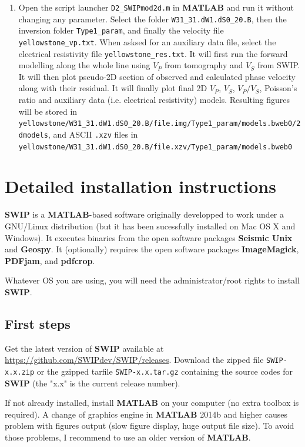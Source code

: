 \documentclass[twoside,a4paper]{article}
\def\SWIP{\textbf{SWIP}}
\def\SeismicUnix{\textbf{Seismic Unix}}
\def\Geopsy{\textbf{Geospy}}
\def\ImageMagick{\textbf{ImageMagick}}
\def\PDFjam{\textbf{PDFjam}}
\def\pdfcrop{\textbf{pdfcrop}}
\def\MATLAB{\textbf{MATLAB}}
\begin{document}
\begin{enumerate}[leftmargin=*]
\item Open the script launcher \verb|D2_SWIPmod2d.m| in {\MATLAB} and run it without changing any parameter. Select the folder \verb|W31_31.dW1.dS0_20.B|, then the inversion folder \verb|Type1_param|, and finally the velocity file \verb|yellowstone_vp.txt|. When asksed for an auxiliary data file, select the electrical resistivity file \verb|yellowstone_res.txt|. It will first run the forward modelling along the whole line using $V_P$ from tomography and $V_S$ from SWIP. It will then plot pseudo-2D section of observed and calculated phase velocity along with their residual. It will finally plot final 2D $V_P$, $V_S$, $V_P/V_S$, Poisson's ratio and auxiliary data (i.e. electrical resistivity) models. Resulting figures will be stored in \verb|yellowstone/W31_31.dW1.dS0_20.B/file.img/Type1_param/models.bweb0/2dmodels|, and ASCII \verb|.xzv| files in \verb|yellowstone/W31_31.dW1.dS0_20.B/file.xzv/Type1_param/models.bweb0|

\end{enumerate}

\newpage
\section{Detailed installation instructions}
\label{sec:detailedinstruc}
{\SWIP} is a \MATLAB-based software originally developped to work under a GNU/Linux distribution (but it has been sucessfully installed on Mac OS X and Windows). It executes binaries from the open software packages {\SeismicUnix} and {\Geopsy}. It (optionally) requires the open software packages {\ImageMagick}, {\PDFjam}, and {\pdfcrop}.

Whatever OS you are using, you will need the administrator/root rights to install {\SWIP}.

\subsection{First steps}
Get the latest version of {\SWIP} available at \url{https://github.com/SWIPdev/SWIP/releases}. Download the zipped file \verb|SWIP-x.x.zip| or the gzipped tarfile \verb|SWIP-x.x.tar.gz| containing the source codes for {\SWIP} (the "x.x" is the current release number).

If not already installed, install {\MATLAB} on your computer (no extra toolbox is required). A change of graphics engine in {\MATLAB} 2014b and higher causes problem with figures output (slow figure display, huge output file size). To avoid those problems, I recommend to use an older version of {\MATLAB}.
\end{document}
